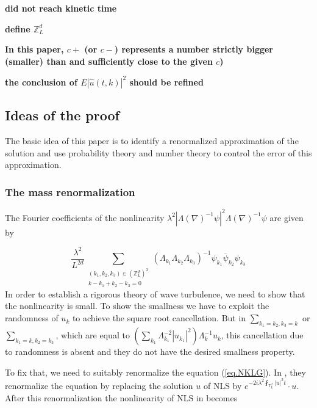 \begin{rem}
\textbf{did not reach kinetic time}
\end{rem}

\textbf{define $\mathbb{Z}_L^d$ }

\textbf{In this paper, $c+$ (or $c-$) represents a number strictly bigger (smaller) than and sufficiently close to the given $c$)}


\textbf{the conclusion of $E |\widehat u(t, k)|^2$ should be refined}
 






 





\subsection{Ideas of the proof} The basic idea of this paper is to identify a renormalized approximation of the solution and use probability theory and number theory to control the error of this approximation.

\subsubsection{The mass renormalization}\label{sec.renormintro} The Fourier coefficients of the nonlinearity $\lambda^2 |\Lambda(\nabla)^{-1}\psi|^2\Lambda(\nabla)^{-1}\psi$ are given by

\begin{equation}
    \frac{\lambda^2}{L^{2d}} \sum\limits_{\substack{(k_1,k_2,k_{3}) \in (\mathbb{Z}^d_L)^3 \\ k - k_1 + k_2 -k_3 = 0}} (\Lambda_{k_1}\Lambda_{k_2}\Lambda_{k_3})^{-1}\psi_{k_1}\overline{\psi}_{k_2}  \psi_{k_3}
\end{equation}
In order to establish a rigorous theory of wave turbulence, we need to show that the nonlinearity is small. To show the smallness we have to exploit the randomness of $u_k$ to achieve the square root cancellation.
But in $\sum_{k_1=k_2,k_3=k}$ or $\sum_{k_1=k,k_2=k_3}$, which are equal to $ (\sum_{k_1}\Lambda_{k_1}^{-2}|u_{k_1}|^2) \Lambda_{k}^{-1}u_k$, this cancellation due to randomness is absent and they do not have the desired smallness property.


To fix that, we need to suitably renormalize the equation (\ref{eq.NKLG}). In \cite{DH}, they renormalize the equation by 
replacing the solution $u$ of NLS by $e^{-2i\lambda^2\fint_{\mathbb{T}_L^d}|u|^2t}\cdot u$. After this renormalization the nonlinearity of NLS in \cite{DH} becomes

